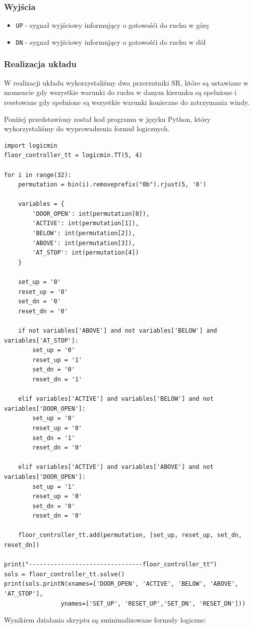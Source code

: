 \documentclass[a4paper]{article}
\begin{document}
\subsubsection{Wyjścia}
\begin{itemize}
    \item \verb|UP| - sygnał wyjściowy informujący o gotowośći do ruchu w górę
    \item \verb|DN| - sygnał wyjściowy informujący o gotowośći do ruchu w dół
\end{itemize}

\subsubsection{Realizacja układu}
W realizacji układu wykorzystaliśmy dwa przerzutniki SR, które są ustawiane w momencie gdy wszystkie
warunki do ruchu w danym kierunku są spełnione i resetowane gdy spełnione są wszystkie warunki konieczne
do zatrzymania windy.

Poniżej przedstawiony został kod programu w języku Python, który wykorzystaliśmy do wyprowadzenia
formuł logicznych.
\begin{verbatim}
import logicmin
floor_controller_tt = logicmin.TT(5, 4)

for i in range(32):
    permutation = bin(i).removeprefix("0b").rjust(5, '0')
    
    variables = {
        'DOOR_OPEN': int(permutation[0]),
        'ACTIVE': int(permutation[1]),
        'BELOW': int(permutation[2]),
        'ABOVE': int(permutation[3]),
        'AT_STOP': int(permutation[4])
    }

    set_up = '0'
    reset_up = '0'
    set_dn = '0'
    reset_dn = '0'

    if not variables['ABOVE'] and not variables['BELOW'] and variables['AT_STOP']:
        set_up = '0'
        reset_up = '1'
        set_dn = '0'
        reset_dn = '1'

    elif variables['ACTIVE'] and variables['BELOW'] and not variables['DOOR_OPEN']:
        set_up = '0'
        reset_up = '0'
        set_dn = '1'
        reset_dn = '0'

    elif variables['ACTIVE'] and variables['ABOVE'] and not variables['DOOR_OPEN']:
        set_up = '1'
        reset_up = '0'
        set_dn = '0'
        reset_dn = '0'

    floor_controller_tt.add(permutation, [set_up, reset_up, set_dn, reset_dn])

print("--------------------------------floor_controller_tt")
sols = floor_controller_tt.solve()
print(sols.printN(xnames=['DOOR_OPEN', 'ACTIVE', 'BELOW', 'ABOVE', 'AT_STOP'],
                ynames=['SET_UP', 'RESET_UP','SET_DN', 'RESET_DN']))
\end{verbatim}
Wynikiem działania skryptu są zminimalizowane formuły logiczne:
\end{document}
